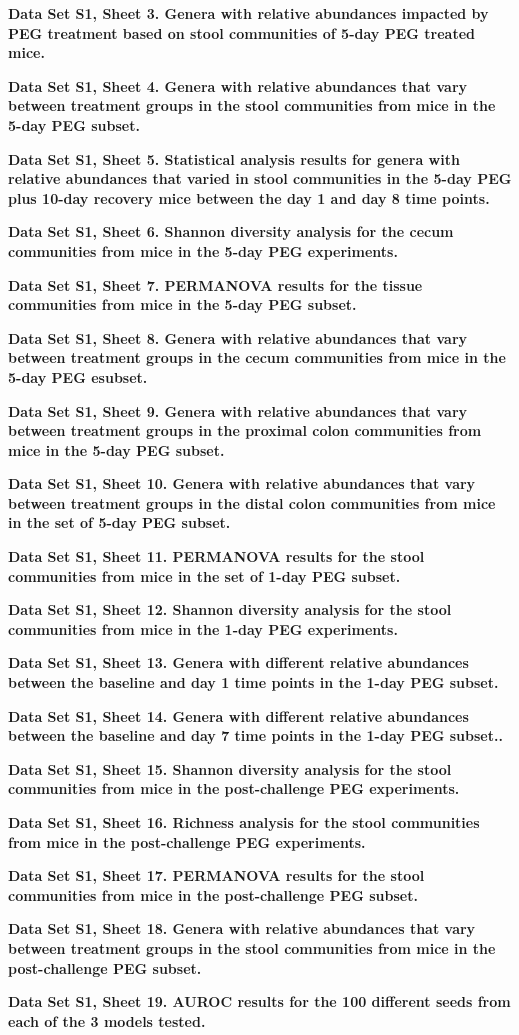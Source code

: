 \documentclass[
  11pt,
]{article}
\begin{document}
\textbf{Data Set S1, Sheet 3. Genera with relative abundances impacted
by PEG treatment based on stool communities of 5-day PEG treated mice.}

\textbf{Data Set S1, Sheet 4. Genera with relative abundances that vary
between treatment groups in the stool communities from mice in the 5-day
PEG subset.}

\textbf{Data Set S1, Sheet 5. Statistical analysis results for genera
with relative abundances that varied in stool communities in the 5-day
PEG plus 10-day recovery mice between the day 1 and day 8 time points.}

\textbf{Data Set S1, Sheet 6. Shannon diversity analysis for the cecum
communities from mice in the 5-day PEG experiments.}

\textbf{Data Set S1, Sheet 7. PERMANOVA results for the tissue
communities from mice in the 5-day PEG subset.}

\textbf{Data Set S1, Sheet 8. Genera with relative abundances that vary
between treatment groups in the cecum communities from mice in the 5-day
PEG esubset.}

\textbf{Data Set S1, Sheet 9. Genera with relative abundances that vary
between treatment groups in the proximal colon communities from mice in
the 5-day PEG subset.}

\textbf{Data Set S1, Sheet 10. Genera with relative abundances that vary
between treatment groups in the distal colon communities from mice in
the set of 5-day PEG subset.}

\textbf{Data Set S1, Sheet 11. PERMANOVA results for the stool
communities from mice in the set of 1-day PEG subset.}

\textbf{Data Set S1, Sheet 12. Shannon diversity analysis for the stool
communities from mice in the 1-day PEG experiments.}

\textbf{Data Set S1, Sheet 13. Genera with different relative abundances
between the baseline and day 1 time points in the 1-day PEG subset.}

\textbf{Data Set S1, Sheet 14. Genera with different relative abundances
between the baseline and day 7 time points in the 1-day PEG subset..}

\textbf{Data Set S1, Sheet 15. Shannon diversity analysis for the stool
communities from mice in the post-challenge PEG experiments.}

\textbf{Data Set S1, Sheet 16. Richness analysis for the stool
communities from mice in the post-challenge PEG experiments.}

\textbf{Data Set S1, Sheet 17. PERMANOVA results for the stool
communities from mice in the post-challenge PEG subset.}

\textbf{Data Set S1, Sheet 18. Genera with relative abundances that vary
between treatment groups in the stool communities from mice in the
post-challenge PEG subset.}

\textbf{Data Set S1, Sheet 19. AUROC results for the 100 different seeds
from each of the 3 models tested.}
\end{document}
